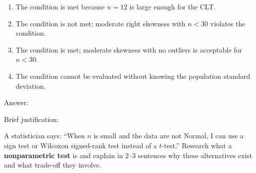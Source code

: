 \documentclass[10pt]{article}
\begin{document}
\begin{enumerate}
\begin{enumerate}[label=(\Alph*)]
  \item The condition is met because $n = 12$ is large enough for the CLT.
  \item The condition is not met; moderate right skewness with $n < 30$ violates the condition.
  \item The condition is met; moderate skewness with no outliers is acceptable for $n < 30$.
  \item The condition cannot be evaluated without knowing the population standard deviation.
\end{enumerate}
\vspace{0.06in}
Answer: \makebox[1.5cm]{\smash{\gradedblank[id=hw4a, type=choice, points=1, answer=C]{0.4in}{0.2in}}}\rule[-0.22in]{0pt}{0.52in}

Brief justification:\par
{}

\end{enumerate}

\begin{extensionbox}
A statistician says: ``When $n$ is small and the data are not Normal, I can use a sign test or
Wilcoxon signed-rank test instead of a $t$-test.'' Research what a \textbf{nonparametric test}
is and explain in 2--3 sentences why these alternatives exist and what trade-off they involve.
\end{extensionbox}
\end{document}

